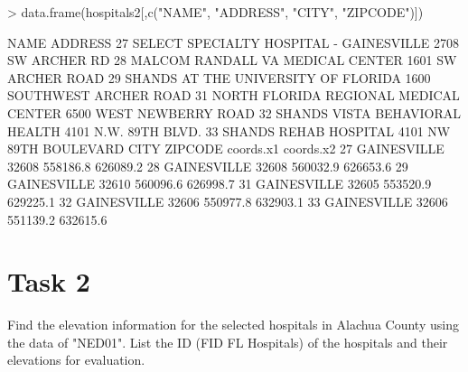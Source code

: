 \documentclass{article}
\begin{document}
\begin{Schunk}
\begin{Sinput}
> data.frame(hospitals2[,c("NAME", "ADDRESS", "CITY", "ZIPCODE")])
\end{Sinput}
\begin{Soutput}
                                      NAME                    ADDRESS
27 SELECT SPECIALTY HOSPITAL - GAINESVILLE          2708 SW ARCHER RD
28        MALCOM RANDALL VA MEDICAL CENTER        1601 SW ARCHER ROAD
29     SHANDS AT THE UNIVERSITY OF FLORIDA 1600 SOUTHWEST ARCHER ROAD
31   NORTH FLORIDA REGIONAL MEDICAL CENTER    6500 WEST NEWBERRY ROAD
32          SHANDS VISTA BEHAVIORAL HEALTH       4101 N.W. 89TH BLVD.
33                   SHANDS REHAB HOSPITAL     4101 NW 89TH BOULEVARD
          CITY ZIPCODE coords.x1 coords.x2
27 GAINESVILLE   32608  558186.8  626089.2
28 GAINESVILLE   32608  560032.9  626653.6
29 GAINESVILLE   32610  560096.6  626998.7
31 GAINESVILLE   32605  553520.9  629225.1
32 GAINESVILLE   32606  550977.8  632903.1
33 GAINESVILLE   32606  551139.2  632615.6
\end{Soutput}
\end{Schunk}



\section*{Task 2}

Find the elevation information for the selected hospitals in Alachua County using the data of "NED01".  List the ID (FID FL Hospitals) of the hospitals and their elevations for evaluation.

\begin{Schunk}
\end{Schunk}
\end{document}
